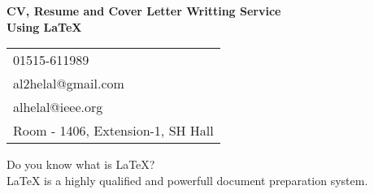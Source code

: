 \documentclass{article}
\begin{document}
\vspace*{\fill}
\begin{center}
  {\LARGE\textbf{CV, Resume and Cover Letter Writting Service \\Using \LaTeX{}}}
\\
\vspace{2cm}
  \begin{tabular}{l}
 \faPhone{} 01515-611989\\
  \faEnvelope{} al2helal@gmail.com\\
  \faEnvelope{} alhelal@ieee.org\\
  \faHome{} Room - 1406, Extension-1, SH Hall
  \end{tabular}

\vspace{2cm}
Do you know what is \LaTeX{}?\\
\LaTeX{} is a highly qualified and powerfull document preparation system.
\end{center}
\vspace*{\fill}
 
\end{document}
